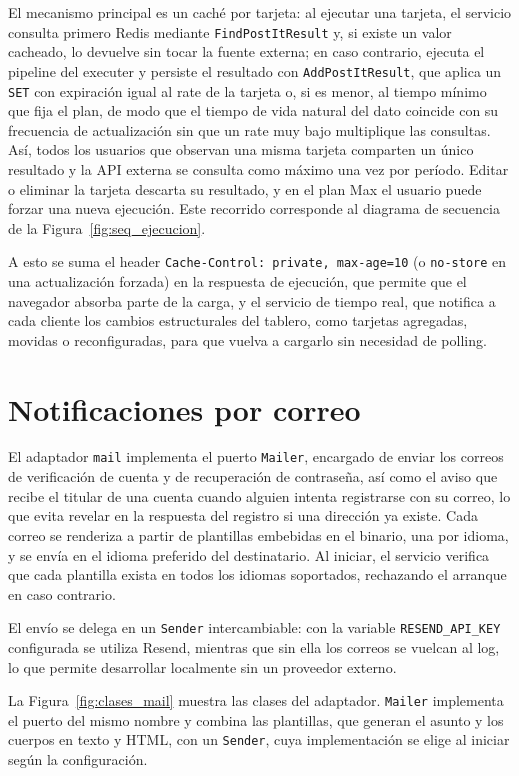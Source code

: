 El mecanismo principal es un caché por tarjeta: al ejecutar una tarjeta, el servicio consulta primero Redis mediante \texttt{FindPostItResult} y, si existe un valor cacheado, lo devuelve sin tocar la fuente externa; en caso contrario, ejecuta el pipeline del executer y persiste el resultado con \texttt{AddPostItResult}, que aplica un \texttt{SET} con expiración igual al rate de la tarjeta o, si es menor, al tiempo mínimo que fija el plan, de modo que el tiempo de vida natural del dato coincide con su frecuencia de actualización sin que un rate muy bajo multiplique las consultas. Así, todos los usuarios que observan una misma tarjeta comparten un único resultado y la API externa se consulta como máximo una vez por período. Editar o eliminar la tarjeta descarta su resultado, y en el plan Max el usuario puede forzar una nueva ejecución. Este recorrido corresponde al diagrama de secuencia de la Figura~\ref{fig:seq_ejecucion}.

A esto se suma el header \texttt{Cache-Control: private, max-age=10} (o \texttt{no-store} en una actualización forzada) en la respuesta de ejecución, que permite que el navegador absorba parte de la carga, y el servicio de tiempo real, que notifica a cada cliente los cambios estructurales del tablero, como tarjetas agregadas, movidas o reconfiguradas, para que vuelva a cargarlo sin necesidad de polling.

\section{Notificaciones por correo}
El adaptador \texttt{mail} implementa el puerto \texttt{Mailer}, encargado de enviar los correos de verificación de cuenta y de recuperación de contraseña, así como el aviso que recibe el titular de una cuenta cuando alguien intenta registrarse con su correo, lo que evita revelar en la respuesta del registro si una dirección ya existe. Cada correo se renderiza a partir de plantillas embebidas en el binario, una por idioma, y se envía en el idioma preferido del destinatario. Al iniciar, el servicio verifica que cada plantilla exista en todos los idiomas soportados, rechazando el arranque en caso contrario.

El envío se delega en un \texttt{Sender} intercambiable: con la variable \texttt{RESEND\_API\_KEY} configurada se utiliza Resend, mientras que sin ella los correos se vuelcan al log, lo que permite desarrollar localmente sin un proveedor externo.

La Figura~\ref{fig:clases_mail} muestra las clases del adaptador. \texttt{Mailer} implementa el puerto del mismo nombre y combina las plantillas, que generan el asunto y los cuerpos en texto y HTML, con un \texttt{Sender}, cuya implementación se elige al iniciar según la configuración.

